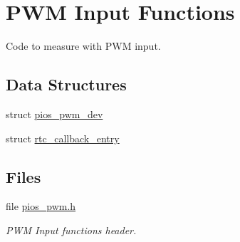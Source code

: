 \hypertarget{group___p_i_o_s___p_w_m}{\section{\-P\-W\-M \-Input \-Functions}
\label{group___p_i_o_s___p_w_m}
}


\-Code to measure with \-P\-W\-M input.  


\subsection*{\-Data \-Structures}
\begin{DoxyCompactItemize}
\item 
struct \hyperlink{structpios__pwm__dev}{pios\-\_\-pwm\-\_\-dev}
\item 
struct \hyperlink{structrtc__callback__entry}{rtc\-\_\-callback\-\_\-entry}
\end{DoxyCompactItemize}
\subsection*{\-Files}
\begin{DoxyCompactItemize}
\item 
file \hyperlink{pios__pwm_8h}{pios\-\_\-pwm.\-h}
\begin{DoxyCompactList}\small\item\em \-P\-W\-M \-Input functions header. \end{DoxyCompactList}\end{DoxyCompactItemize}
